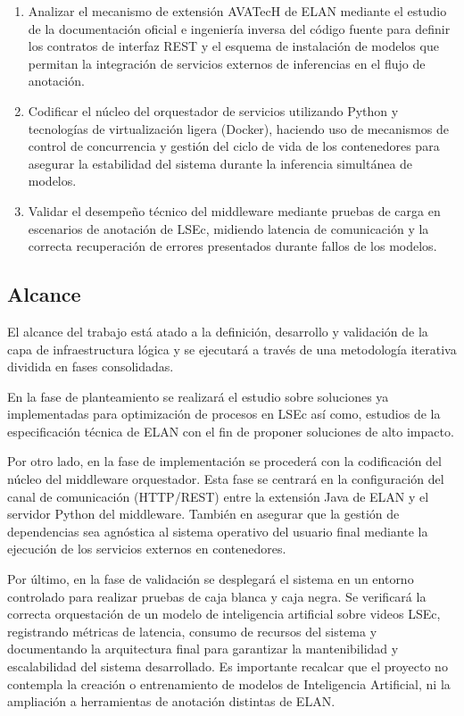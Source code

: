 \documentclass[11pt,a4paper]{article}
\begin{document}
\begin{enumerate}
    \item Analizar el mecanismo de extensión AVATecH de ELAN mediante el estudio de la documentación oficial e ingeniería inversa del código fuente para definir los contratos de interfaz REST y el esquema de instalación de modelos que permitan la integración de servicios externos de inferencias en el flujo de anotación.
    \item Codificar el núcleo del orquestador de servicios utilizando Python y tecnologías de virtualización ligera (Docker), haciendo uso de mecanismos de control de concurrencia y gestión del ciclo de vida de los contenedores para asegurar la estabilidad del sistema durante la inferencia simultánea de modelos.
    \item Validar el desempeño técnico del middleware mediante pruebas de carga en escenarios de anotación de LSEc, midiendo latencia de comunicación y la correcta recuperación de errores presentados durante fallos de los modelos.

\end{enumerate}

\subsection{Alcance}

El alcance del trabajo está atado a la definición, desarrollo y validación de la capa de infraestructura lógica y se ejecutará a través de una metodología iterativa dividida en fases consolidadas.

En la fase de planteamiento se realizará el estudio sobre soluciones ya implementadas para optimización de procesos en LSEc así como, estudios de la especificación técnica de ELAN con el fin de proponer soluciones de alto impacto.

Por otro lado, en la fase de implementación se procederá con la codificación del núcleo del middleware orquestador. Esta fase se centrará en la configuración del canal de comunicación (HTTP/REST) entre la extensión Java de ELAN y el servidor Python del middleware. También en asegurar que la gestión de dependencias sea agnóstica al sistema operativo del usuario final mediante la ejecución de los servicios externos en contenedores. 

Por último, en la fase de validación se desplegará el sistema en un entorno controlado para realizar pruebas de caja blanca y caja negra. Se verificará la correcta orquestación de un modelo de inteligencia artificial sobre videos LSEc, registrando métricas de latencia, consumo de recursos del sistema y documentando la arquitectura final para garantizar la mantenibilidad y escalabilidad del sistema desarrollado. Es importante recalcar que el proyecto no contempla la creación o entrenamiento de modelos de Inteligencia Artificial, ni la ampliación a herramientas de anotación distintas de ELAN.
\end{document}
